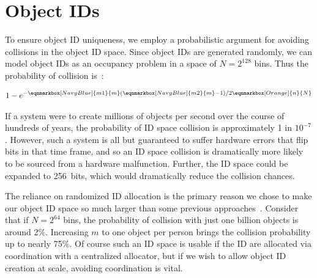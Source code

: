 \section{Object IDs}


To ensure object ID uniqueness, we employ a probabilistic argument for avoiding collisions in the
object ID space. Since object IDs are generated randomly, we can model object IDs as an occupancy
problem in a space of $N = 2^{128}$ bins. Thus the probability of collision
is~\cite{motwani95}:

\begin{gather*}
    1 - e^{-
            \eqnmarkbox[NavyBlue]{m1}{m}
            (
            \eqnmarkbox[NavyBlue]{m2}{m}
            -1) / 2
            \eqnmarkbox[Orange]{n}{N}
        }
\end{gather*}

If a system were to create millions of objects per second over the course of hundreds of years, the
probability of ID space collision is approximately 1 in $10^{-7}$. However, such a system is all but
guaranteed to suffer hardware errors that flip bits in that time frame, and so an ID space collision is dramatically more likely to be
sourced from a hardware malfunction. Further, the ID space
could be expanded to 256~bits, which would dramatically reduce the collision chances.

The reliance on randomized ID allocation is the primary reason we chose to make our object ID space
so much larger than some previous approaches~\cite{pmdk,pmdk-pointers}. Consider that if $N = 2^{64}$
bins, the probability of collision with just one billion objects is around 2\%. Increasing $m$ to
one object per person brings the collision probability up to nearly 75\%. Of course such an ID space
is usable if the ID are allocated via coordination with a centralized allocator, but if
we wish to allow object ID creation at scale, avoiding coordination is vital.
